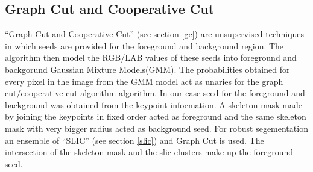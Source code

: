 \documentclass[conference]{IEEEtran}
\begin{document}
\subsection{Graph Cut and Cooperative Cut}\label{gcm}

``Graph Cut and Cooperative Cut'' (see section \ref{gc}) are unsupervised techniques in which seeds are provided for the foreground and background region. The algorithm then model the RGB/LAB values of these seeds into foreground and backgorund Gaussian Mixture Models(GMM). The probabilities obtained for every pixel in the image from the GMM model act as unaries for the graph cut/cooperative cut algorithm algorithm. In our case seed for the foreground and background was obtained from the keypoint infoemation. A skeleton mask made by joining the keypoints in fixed order acted as foreground and the same skeleton mask with very bigger radius acted as background seed. For robust segementation an ensemble of ``SLIC'' (see section \ref{slic}) and Graph Cut is used. The intersection of the skeleton mask and the slic clusters make up the foreground seed. 
\end{document}
